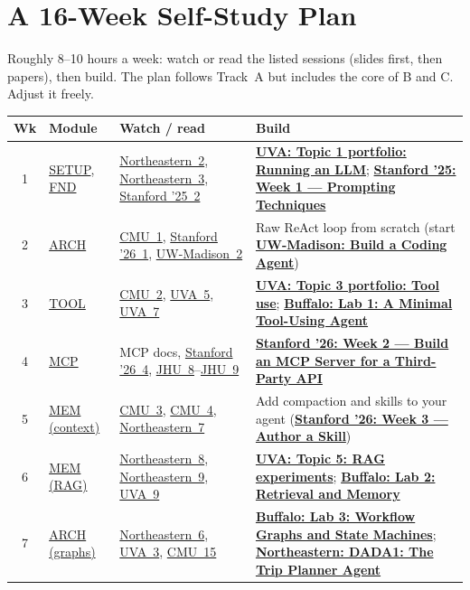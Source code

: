 \documentclass[10pt,oneside]{report}
\begin{document}
\section{A 16-Week Self-Study Plan}\hypertarget{plan16}{}
Roughly 8--10 hours a week: watch or read the listed sessions (slides first, then papers), then build. The plan follows Track~A but includes the core of B and C. Adjust it freely.
{\footnotesize\begin{longtable}{c P{2.4cm} P{6.4cm} P{6.4cm}}
\toprule Wk & Module & Watch / read & Build\\ \midrule{} & \hyperlink{mod-SETUP}{SETUP}, \hyperlink{mod-FND}{FND} & \hyperlink{lec-NEU-2}{Northeastern~2}, \hyperlink{lec-NEU-3}{Northeastern~3}, \hyperlink{lec-STAN25-2}{Stanford '25~2} & \hyperlink{asg-UVA-1}{\textbf{UVA: Topic 1 portfolio: Running an LLM}}; \hyperlink{asg-STAN25-1}{\textbf{Stanford '25: Week 1 --- Prompting Techniques}}\\  & \hyperlink{mod-ARCH}{ARCH} & \hyperlink{lec-CMU-1}{CMU~1}, \hyperlink{lec-STAN26-1}{Stanford '26~1}, \hyperlink{lec-UW-2}{UW-Madison~2} & Raw ReAct loop from scratch (start \hyperlink{asg-UW-1}{\textbf{UW-Madison: Build a Coding Agent}})\\  & \hyperlink{mod-TOOL}{TOOL} & \hyperlink{lec-CMU-2}{CMU~2}, \hyperlink{lec-UVA-5}{UVA~5}, \hyperlink{lec-UVA-7}{UVA~7} & \hyperlink{asg-UVA-3}{\textbf{UVA: Topic 3 portfolio: Tool use}}; \hyperlink{asg-UB-1}{\textbf{Buffalo: Lab 1: A Minimal Tool-Using Agent}}\\  & \hyperlink{mod-MCP}{MCP} & MCP docs, \hyperlink{lec-STAN26-4}{Stanford '26~4}, \hyperlink{lec-JHU-8}{JHU~8}--\hyperlink{lec-JHU-9}{JHU~9} & \hyperlink{asg-STAN26-2}{\textbf{Stanford '26: Week 2 --- Build an MCP Server for a Third-Party API}}\\  & \hyperlink{mod-MEM}{MEM (context)} & \hyperlink{lec-CMU-3}{CMU~3}, \hyperlink{lec-CMU-4}{CMU~4}, \hyperlink{lec-NEU-7}{Northeastern~7} & Add compaction and skills to your agent (\hyperlink{asg-STAN26-3}{\textbf{Stanford '26: Week 3 --- Author a Skill}})\\  & \hyperlink{mod-MEM}{MEM (RAG)} & \hyperlink{lec-NEU-8}{Northeastern~8}, \hyperlink{lec-NEU-9}{Northeastern~9}, \hyperlink{lec-UVA-9}{UVA~9} & \hyperlink{asg-UVA-5}{\textbf{UVA: Topic 5: RAG experiments}}; \hyperlink{asg-UB-2}{\textbf{Buffalo: Lab 2: Retrieval and Memory}}\\  & \hyperlink{mod-ARCH}{ARCH (graphs)} & \hyperlink{lec-NEU-6}{Northeastern~6}, \hyperlink{lec-UVA-3}{UVA~3}, \hyperlink{lec-CMU-15}{CMU~15} & \hyperlink{asg-UB-3}{\textbf{Buffalo: Lab 3: Workflow Graphs and State Machines}}; \hyperlink{asg-NEU-1}{\textbf{Northeastern: DADA1: The Trip Planner Agent}}\\ \midrule

\end{longtable}}
\end{document}
